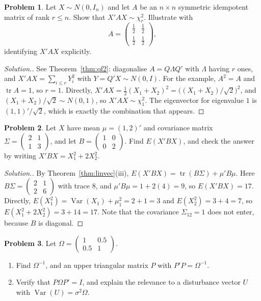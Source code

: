 \documentclass[11pt,a4paper]{article}
\numberwithin{equation}{section}
\DeclareMathOperator{\Var}{Var}
\DeclareMathOperator{\tr}{tr}
\theoremstyle{definition}
\newtheorem{problemx}{Problem}[subsection]
\newenvironment{problem}{\begin{problemx}}{\end{problemx}}
\newenvironment{solution}
  {\renewcommand{\qedsymbol}{}\begin{proof}[\textit{Solution}.]}
  {\end{proof}}
\begin{document}
\begin{problem}
Let $X \sim N(0, I_n)$ and let $A$ be an $n \times n$ symmetric idempotent matrix of rank $r \leq n$. Show that $X'AX \sim \chi^2_r$. Illustrate with
\[
A = \begin{pmatrix} \frac12 & \frac12 \\ \frac12 & \frac12 \end{pmatrix},
\]
identifying $X'AX$ explicitly.
\end{problem}

\begin{solution}
See Theorem~\ref{thm:qf2}: diagonalise $A = Q\Lambda Q'$ with $\Lambda$ having $r$ ones, and $X'AX = \sum_{i\leq r}Y_i^2$ with $Y = Q'X \sim N(0, I)$. For the
example, $A^2 = A$ and $\tr A = 1$, so $r = 1$. Directly, $X'AX = \frac12(X_1 + X_2)^2 = \bigl((X_1 + X_2)/\sqrt2\bigr)^2$, and $(X_1 + X_2)/\sqrt2 \sim N(0, 1)$, so
$X'AX \sim \chi^2_1$. The eigenvector for eigenvalue $1$ is $(1, 1)'/\sqrt2$, which is exactly the combination that appears.
\end{solution}

\begin{problem}
Let $X$ have mean $\mu = (1, 2)'$ and covariance matrix $\Sigma = \begin{pmatrix} 2 & 1 \\ 1 & 3 \end{pmatrix}$, and let
$B = \begin{pmatrix} 1 & 0 \\ 0 & 2 \end{pmatrix}$. Find $E(X'BX)$, and check the answer by writing $X'BX = X_1^2 + 2X_2^2$.
\end{problem}

\begin{solution}
By Theorem~\ref{thm:linvec}(iii), $E(X'BX) = \tr(B\Sigma) + \mu'B\mu$. Here $B\Sigma = \begin{pmatrix} 2 & 1 \\ 2 & 6 \end{pmatrix}$ with trace $8$, and
$\mu'B\mu = 1 + 2(4) = 9$, so $E(X'BX) = 17$. Directly, $E(X_1^2) = \Var(X_1) + \mu_1^2 = 2 + 1 = 3$ and $E(X_2^2) = 3 + 4 = 7$, so
$E(X_1^2 + 2X_2^2) = 3 + 14 = 17$. Note that the covariance $\Sigma_{12} = 1$ does not enter, because $B$ is diagonal.
\end{solution}

\begin{problem}
Let $\Omega = \begin{pmatrix} 1 & 0.5 \\ 0.5 & 1 \end{pmatrix}$.
\begin{enumerate}[label=(\alph*)]
\item Find $\Omega^{-1}$, and an upper triangular matrix $P$ with $P'P = \Omega^{-1}$.
\item Verify that $P\Omega P' = I$, and explain the relevance to a disturbance vector $U$ with $\Var(U) = \sigma^2\Omega$.
\end{enumerate}
\end{problem}
\end{document}
